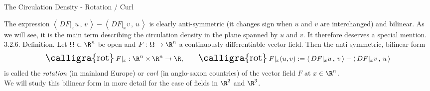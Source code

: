 \documentclass[smaller,hyperref={CJKbookmarks=true}]{beamer}
\newcommand{\scp}[2]{\left\langle\,#1\,,\,#2\,\right\rangle} \newcommand{\scpp}{\langle\,\cdot\,,\,\cdot\,\rangle}
\newcommand{\rot}{\text{\Large{\calligra{rot}}\,}}
\begin{document}
\begin{frame}[t]{The Circulation Density - Rotation / Curl}
\begin{spacing}{1.2}
The expression $\scp{DF|_xu}{v}-\scp{DF|_xv}{u}$ is clearly anti-symmetric (it changes sign when $u$ and $v$ are interchanged) and bilinear. As we will see,
it is the main term describing the circulation density in the plane spanned
by $u$ and $v$. It therefore deserves a special mention.\\[5pt]
\alert{3.2.6. Definition.} Let $\Omega\subset\R^n$ be open and $F:\Omega\to\R^n$ a continuously dif{}ferentiable vector field. Then the anti-symmetric, bilinear form
\begin{equation}\label{3.2.3}
\rot F|_x:\R^n\times\R^n\to\R,\qquad
\rot F|_x(u,v):=\scp{DF|_xu}{v}-\scp{DF|_xv}{u}
\end{equation}
is called the \emph{rotation} (in mainland Europe) or \emph{curl} (in anglo-saxon countries) of the vector field $F$ at $x\in\R^n$.\\[6pt]
We will study this bilinear form in more detail for the case of fields in $\R^2$ and $\R^3$.
\end{spacing}
\end{frame}
\end{document}
